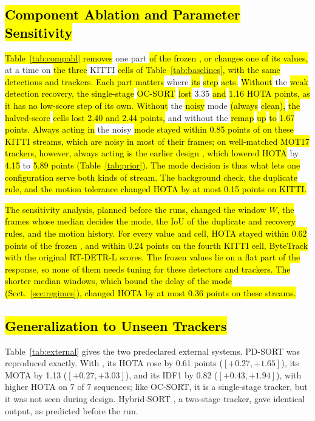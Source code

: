 \subsection[Component Ablation and Parameter Sensitivity]{\hl{Component Ablation and Parameter Sensitivity}}\label{sec:ablation}
\hl{Table~\ref{tab:compabl} removes} one part \hl{of the frozen \scl{}, or changes one of its values,} at a
time on \hl{the three} KITTI \hl{cells of Table~\ref{tab:baselines}, with the same detections and trackers.
Each part matters} where \hl{its} \hl{step} \hl{acts.} \hl{Without} the \hl{weak} \hl{detection recovery, the single-stage}
\hl{OC-SORT} \hl{lost} 3.35 \hl{and} \hl{1.16 HOTA points, as it has no low-score step of its own. Without} the \hl{noisy}
mode \hl{(always} \hl{clean),} \hl{the} \hl{halved-score} \hl{cells lost 2.40 and 2.44 points,} and without the \hl{remap} \hl{up} \hl{to}
\hl{1.67 points. Always acting in} the noisy \hl{mode stayed within 0.85 points of \scl{} on these KITTI
streams, which are noisy in most of their frames; on well-matched MOT17 trackers, however, always
acting is the earlier design \aob{}, which lowered HOTA} by \hl{4.15} to \hl{5.89 points
(Table~\ref{tab:prior}). The mode decision is thus what lets one configuration serve both kinds of
stream. The background check, the duplicate rule, and the motion tolerance changed HOTA by at most
0.15 points on KITTI.}

\hl{The sensitivity analysis, planned before the runs, changed the window $W$, the frames whose median
decides the mode, the IoU of the duplicate and recovery rules, and the motion history. For every
value and cell, HOTA stayed within 0.62 points of the frozen \scl{}, and within 0.24 points on the
fourth KITTI cell, ByteTrack with the original RT-DETR-L scores. The frozen values lie on a flat
part of the response, so none of them needs tuning for these detectors and trackers. The shorter
median windows, which bound the delay of the mode (Sect.~\ref{sec:regimes}), changed HOTA by at most
0.36 points on these streams.}


\subsection[Generalization to Unseen Trackers]{\hl{Generalization to Unseen Trackers}}\label{sec:external}
Table~\ref{tab:external} gives the two predeclared external systems. PD-SORT \cite{wang2025pdsort}
was reproduced exactly. With \scl{}, its HOTA rose by 0.61 points ($[+0.27,+1.65]$), its MOTA by
1.13 ($[+0.27,+3.03]$), and its IDF1 by 0.82 ($[+0.43,+1.94]$), with higher HOTA on 7 of 7
sequences; like OC-SORT, it is a single-stage tracker, but it was not seen during design.
Hybrid-SORT \cite{yang2024hybridsort}, a two-stage tracker, gave identical output, as predicted
before the run.


